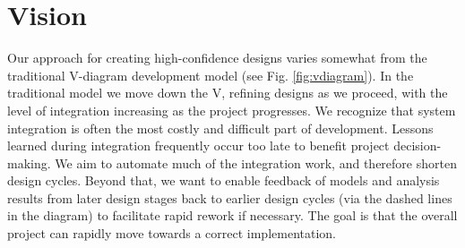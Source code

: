 % 


\section{Vision}


Our approach for creating high-confidence designs varies somewhat from the 
traditional V-diagram development model (see Fig. \ref{fig:vdiagram}).  In the
traditional model we move down the V, refining designs as we proceed, with the
level of integration increasing as the project progresses.  We recognize that
system integration is often the most costly and difficult part of development.
Lessons learned during integration frequently occur too late to benefit project
decision-making.  We aim to automate much of the integration work, and therefore
shorten design cycles.  Beyond that, we want to enable feedback of models and
analysis results from later design stages back to earlier design cycles (via
the dashed lines in the diagram) to facilitate rapid rework if necessary.  The
goal is that the overall project can rapidly move towards a correct implementation.

